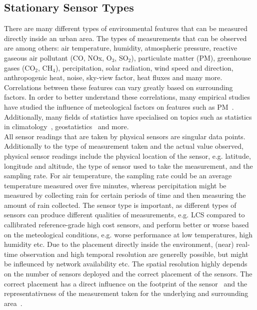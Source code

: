 \subsection{Stationary Sensor Types}
There are many different types of environmental features that can be measured directly inside an urban area. The types of measurements that can be observed are among others: air temperature, humidity, atmospheric pressure, reactive gaseous air pollutant (CO, NOx, O$_3$, SO$_2$), particulate matter (PM), greenhouse gases (CO$_2$, CH$_4$), percipitation, solar radiation, wind speed and direction, anthropogenic heat, noise, sky-view factor, heat fluxes and many more. Correlations between these features can vary greatly based on surrounding factors. In order to better understand these correlations, many empirical studies have studied the influence of meteological factors on features such as PM~\cite{tai2010correlations}. Additionally, many fields of statistics have specialised on topics such as statistics in climatology~\cite{von2002statistical}, geostatistics~\cite{trangmar1986application} and more.\\
All sensor readings that are taken by physical sensors are singular data points. Additionally to the type of measurement taken and the actual value observed, physical sensor readings include the physical location of the sensor, e.g. latitude, longitude and altitude, the type of sensor used to take the measurement, and the sampling rate. For air temperature, the sampling rate could be an average temperature measured over five minutes, whereas percipitation might be measured by collecting rain for certain periods of time and then measuring the amount of rain collected. The sensor type is important, as different types of sensors can produce different qualities of measurements, e.g. LCS compared to callibrated reference-grade high cost sensors, and perform better or worse based on the meteological conditions, e.g. worse performance at low temperatures, high humidity etc. Due to the placement directly inside the environment, (near) real-time observation and high temporal resolution are generelly possible, but might be infleunced by network availability etc. The spatial resolution highly depends on the number of sensors deployed and the correct placement of the sensors. The correct placement has a direct influence on the footprint of the sensor~\cite{leclerc2014footprints} and the representativness of the measurement taken for the underlying and surrounding area~\cite{oke2006guideline}.


